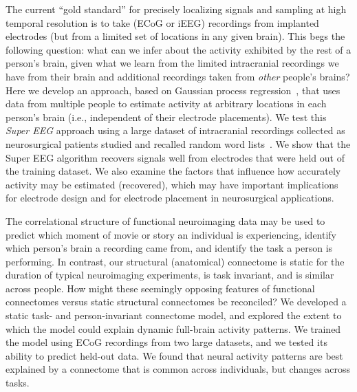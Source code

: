 The current ``gold standard'' for precisely localizing signals and
sampling at high temporal resolution is to take (ECoG or iEEG)
recordings from implanted electrodes (but from a limited set of
locations in any given brain).  This begs the following question: what
can we infer about the activity exhibited by the rest of a person's
brain, given what we learn from the limited intracranial recordings we
have from their brain and additional recordings taken from
\textit{other} people's brains?  Here we develop an approach, based on
Gaussian process regression~\cite{Rasm06}, that uses data from
multiple people to estimate activity at arbitrary
locations in each person's brain (i.e., independent of their electrode
placements).  We test this \textit{Super EEG} approach using a large
dataset of intracranial recordings collected as neurosurgical patients
studied and recalled random word lists~\cite{SedeEtal03, SedeEtal07a,
  SedeEtal07b, MannEtal11, MannEtal12}.  We show that the Super EEG
algorithm recovers signals well from electrodes that were held out of
the training dataset.  We also examine the factors that influence how
accurately activity may be estimated (recovered), which may have important
implications for electrode design and for electrode placement in
neurosurgical applications.



  
  The correlational structure of functional neuroimaging data may be
  used to predict which moment of movie or story an individual is
  experiencing, identify which person's brain a recording came from,
  and identify the task a person is performing.  In contrast, our
  structural (anatomical) connectome is static for the duration of
  typical neuroimaging experiments, is task invariant, and is similar
  across people.  How might these seemingly opposing features of
  functional connectomes versus static structural connectomes be
  reconciled?  We developed a static task- and person-invariant
  connectome model, and explored the extent to which the model could
  explain dynamic full-brain activity patterns.  We trained the model
  using ECoG recordings from two large datasets, and we tested its
  ability to predict held-out data.  We found that neural activity
  patterns are best explained by a connectome that is common across
  individuals, but changes across tasks.




